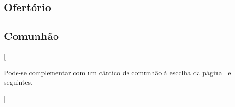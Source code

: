 \AllowPageFlush

\subsection{Ofertório}\label{subsection:proprium-sanctorum/in-praesentatione-domini/offertorium}
\def\AntiphonAnnotation{\CantusID{002216}[Sl 45(44),3]}
\def\AntiphonScore{diffusa-est-gratia.1g4/}

\AllowPageFlush

\subsection{Comunhão}\label{subsection:proprium-sanctorum/in-praesentatione-domini/communio}
\def\AntiphonAnnotation{\CantusID{004639}[Lc 2,26]}
\def\AntiphonScore{responsum-accepit-simeon.7a/}
[%
  \begin{rubrica}
    Pode-se complementar com um cântico de comunhão à escolha da página~\pageref{appendix:communio-ad-libitum/communio-1} e seguintes.
  \end{rubrica}%
]